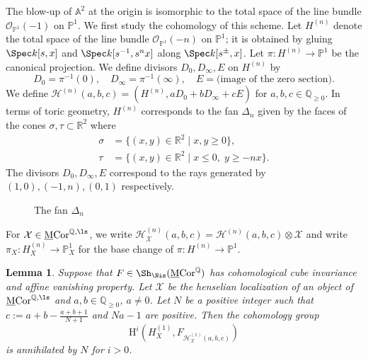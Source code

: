 \documentclass{amsart}
\theoremstyle{plain}
\newtheorem{lemma}[theorem]{Lemma}
\theoremstyle{definition}
\theoremstyle{remark}
\numberwithin{equation}{section}
\def\MCor{\mathrm{\underline{M}Cor}}
\begin{document}
The blow-up of $\mathbb{A}^2$ at the origin is isomorphic to the total space of the line bundle $\mathcal{O}_{\mathbb{P}^1}(-1)$ on $\mathbb{P}^1$.
We first study the cohomology of this scheme.
Let $H^{(n)}$ denote the total space of the line bundle $\mathcal{O}_{\mathbb{P}^1}(-n)$ on $\mathbb{P}^1$;
it is obtained by gluing $\Spec k[s,x]$ and $\Spec k[s^{-1},s^nx]$ along $\Spec k[s^\pm,x]$.
Let $\pi\colon H^{(n)}\to \mathbb{P}^1$ be the canonical projection.
We define divisors $D_0, D_\infty, E$ on $H^{(n)}$ by
$$
	D_0 = \pi^{-1}(0),\quad D_\infty = \pi^{-1}(\infty), \quad E = \text{(image of the zero section)}.
$$
We define $\mathcal{H}^{(n)}(a,b,c)=(H^{(n)}, a D_0+b D_\infty+c E)$ for $a,b,c\in \mathbb{Q}_{\geq 0}$.
In terms of toric geometry, $H^{(n)}$ corresponds to the fan $\Delta_n$ given by the faces of the cones $\sigma,\tau\subset \mathbb{R}^2$ where
\begin{align*}
    \sigma &{}= \{(x,y)\in \mathbb{R}^2\mid x,y\geq 0\},\\
    \tau &{}= \{(x,y)\in \mathbb{R}^2\mid x\leq 0,\;y\geq -nx\}.
\end{align*}
The divisors $D_0,D_\infty,E$ correspond to the rays generated by $(1,0),(-1,n),(0,1)$ respectively.

\begin{figure}[h]
    \caption{The fan $\Delta_n$}
\end{figure}

For $\mathcal{X}\in \MCor^{\mathbb{Q},\ls}$, we write $\mathcal{H}^{(n)}_\mathcal{X}(a,b,c) = \mathcal{H}^{(n)}(a,b,c)\otimes \mathcal{X}$ and write $\pi_X\colon H^{(n)}_X\to \mathbb{P}^1_X$ for the base change of $\pi\colon H^{(n)}\to \mathbb{P}^1$.

\begin{lemma}\label{Hirzebruch_vanishing}
    Suppose that $F\in \Sh_\Nis(\MCor^{\mathbb{Q}})$ has cohomological cube invariance and affine vanishing property.
    Let $\mathcal{X}$ be the henselian localization of an object of $\MCor^{\mathbb{Q},\ls}$ and $a,b\in \mathbb{Q}_{\geq 0}$, $a\neq 0$.
    Let $N$ be a positive integer such that $c:=a+b-\frac{a+b+1}{N+1}$ and $Na-1$ are positive.
    Then the cohomology group
    $$
        \mathrm{H}^i(H^{(1)}_X, F_{\mathcal{H}^{(1)}_\mathcal{X}(a,b,c)})
    $$
    is annihilated by $N$ for $i>0$.
\end{lemma}
\end{document}
